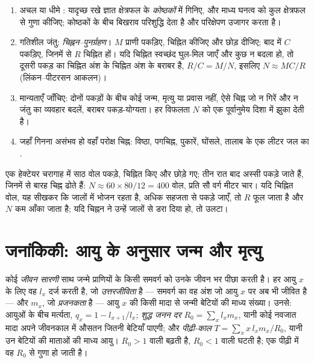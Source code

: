 \begin{method}[किसी आबादी का आकलन]\label{met:b1:populations:counting}
\begin{enumerate}
  \item अचल या धीमे : यादृच्छ रखे ज्ञात क्षेत्रफल के
        \emph{कोष्ठकों} में गिनिए, और माध्य घनत्व को कुल क्षेत्रफल से
        गुणा कीजिए; कोष्ठकों के बीच बिखराव परिशुद्धि देता है और
        परिक्षेपण उजागर करता है।
  \item गतिशील जंतु: \emph{चिह्नन--पुनर्ग्रहण}। $M$ प्राणी पकड़िए,
        चिह्नित कीजिए और छोड़ दीजिए; बाद में $C$ पकड़िए, जिनमें से
        $R$ चिह्नित हों। यदि चिह्नित स्वच्छंद घुल-मिल जाएँ और कुछ न
        बदला हो, तो दूसरी पकड़ का चिह्नित अंश  के चिह्नित अंश के
        बराबर है, $R/C = M/N$, इसलिए
        $N \approx MC/R$ (लिंकन--पीटरसन आकलन)।
  \item मान्यताएँ जाँचिए: दोनों पकड़ों के बीच कोई जन्म, मृत्यु या
        प्रवास नहीं, ऐसे चिह्न जो न गिरें और न जंतु का व्यवहार बदलें,
        बराबर पकड़-योग्यता। हर विफलता
        $N$ को एक पूर्वानुमेय दिशा में झुका देती है।
  \item जहाँ गिनना असंभव हो वहाँ परोक्ष चिह्न: विष्ठा, पगचिह्न,
        पुकारें, घोंसले, तालाब के एक लीटर जल का .
\end{enumerate}
\end{method}

\begin{example}[किसी चरागाह में वोल]\label{ex:b1:populations:voles}
एक हेक्टेयर चरागाह में साठ वोल पकड़े, चिह्नित किए और छोड़े गए; तीन रात
बाद अस्सी पकड़े जाते हैं, जिनमें से बारह चिह्न ढोते हैं:
$N \approx 60\times 80/12 = 400$ वोल, प्रति सौ वर्ग मीटर चार। यदि
चिह्नित वोल, यह सीखकर कि जालों में भोजन रहता है, अधिक सहजता से पकड़े
जाएँ, तो $R$ फूल जाता है और $N$ कम आँका जाता है; यदि चिह्नन ने उन्हें
जालों से डरा दिया हो, तो उलटा।
\end{example}

\section{जनांकिकी: आयु के अनुसार जन्म और मृत्यु}

\begin{definition}[जीवन सारणी]\label{def:b1:populations:lifetable}
कोई \emph{जीवन सारणी} साथ जन्मे प्राणियों के किसी समवर्ग को उनके जीवन भर
पीछा करती है। हर आयु $x$ के लिए वह $l_x$ दर्ज करती है, जो
\emph{उत्तरजीविता} है --- समवर्ग का वह अंश जो आयु
$x$ पर अब भी जीवित है --- और $m_x$, जो \emph{प्रजनकता} है --- आयु
$x$ की किसी मादा से जन्मी बेटियों की माध्य संख्या। उनसे: आयुओं के बीच
मर्त्यता, $q_x = 1 - l_{x+1}/l_x$; \emph{शुद्ध जनन
दर} $R_0 = \sum_x l_x m_x$, यानी कोई नवजात मादा अपने जीवनकाल में औसतन
जितनी बेटियाँ पाएगी; और \emph{पीढ़ी-काल}
$T = \sum_x x\,l_x m_x / R_0$, यानी उन बेटियों की माताओं की माध्य आयु।
$R_0 > 1$ वाली  बढ़ती है, $R_0 < 1$ वाली घटती है; एक पीढ़ी में वह
$R_0$ से गुणा हो जाती है।
\end{definition}

